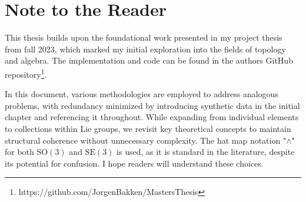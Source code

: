 \section*{Note to the Reader}

This thesis builds upon the foundational work presented in my project thesis \cite{bakkenLieGroupMethods2023} from fall 2023, which marked my initial exploration into the fields of topology and algebra. The implementation and code can be found in the authors GitHub repository\footnote{https://github.com/JorgenBakken/MastersThesis}.

In this document, various methodologies are employed to address analogous problems, with redundancy minimized by introducing synthetic data in the initial chapter and referencing it throughout. While expanding from individual elements to collections within Lie groups, we revisit key theoretical concepts to maintain structural coherence without unnecessary complexity. The hat map notation "\(\wedge\)" for both \(\mathrm{SO}(3)\) and \(\mathrm{SE}(3)\) is used, as it is standard in the literature, despite its potential for confusion. I hope readers will understand these choices.